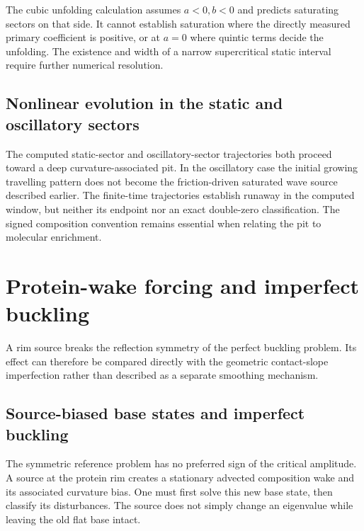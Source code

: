 The cubic unfolding calculation assumes $a<0,b<0$ and predicts saturating sectors on that side. It cannot establish saturation where the directly measured primary coefficient is positive, or at $a=0$ where quintic terms decide the unfolding. The existence and width of a narrow supercritical static interval require further numerical resolution.




\subsection{Nonlinear evolution in the static and oscillatory sectors}


The computed static-sector and oscillatory-sector trajectories both proceed toward a deep curvature-associated pit. In the oscillatory case the initial growing travelling pattern does not become the friction-driven saturated wave source described earlier. The finite-time trajectories establish runaway in the computed window, but neither its endpoint nor an exact double-zero classification. The signed composition convention remains essential when relating the pit to molecular enrichment.


\section{Protein-wake forcing and imperfect buckling}\label{sec:wake}
A rim source breaks the reflection symmetry of the perfect buckling problem. Its effect can therefore be compared directly with the geometric contact-slope imperfection rather than described as a separate smoothing mechanism.


\subsection{Source-biased base states and imperfect buckling}
The symmetric reference problem has no preferred sign of the critical amplitude. A source at the protein rim creates a stationary advected composition wake and its associated curvature bias. One must first solve this new base state, then classify its disturbances. The source does not simply change an eigenvalue while leaving the old flat base intact.

